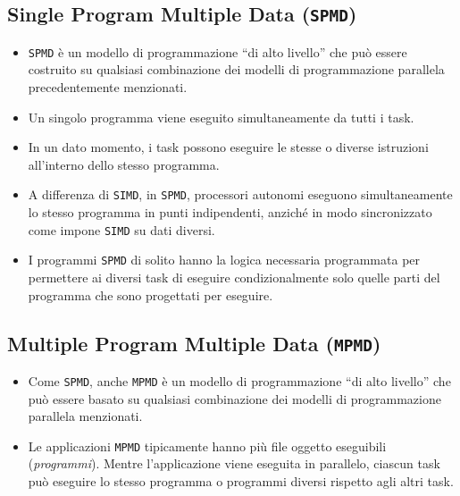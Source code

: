 \subsection{Single Program Multiple Data (\texttt{SPMD})}
\begin{itemize}
    \item \texttt{SPMD} è un modello di programmazione
    ``di alto livello'' che può essere costruito su
    qualsiasi combinazione dei modelli di programmazione
    parallela precedentemente menzionati.
    \item Un singolo programma viene eseguito
    simultaneamente da tutti i task.
    \item In un dato momento, i task possono eseguire
    le stesse o diverse istruzioni all'interno dello
    stesso programma.
    \item A differenza di \texttt{SIMD}, in \texttt{SPMD},
    processori autonomi eseguono simultaneamente lo stesso
    programma in punti indipendenti, anziché in modo
    sincronizzato come impone \texttt{SIMD} su dati
    diversi.
    \item I programmi \texttt{SPMD} di solito hanno la
    logica necessaria programmata per permettere ai
    diversi task di eseguire condizionalmente solo
    quelle parti del programma che sono progettati per
    eseguire.
\end{itemize}

\subsection{Multiple Program Multiple Data (\texttt{MPMD})}
\begin{itemize}
    \item Come \texttt{SPMD}, anche \texttt{MPMD} è un
    modello di programmazione ``di alto livello'' che può
    essere basato su qualsiasi combinazione dei modelli
    di programmazione parallela menzionati.
    \item Le applicazioni \texttt{MPMD} tipicamente hanno
    più file oggetto eseguibili (\textit{programmi}). Mentre
    l'applicazione viene eseguita in parallelo, ciascun
    task può eseguire lo stesso programma o programmi
    diversi rispetto agli altri task.
\end{itemize}
